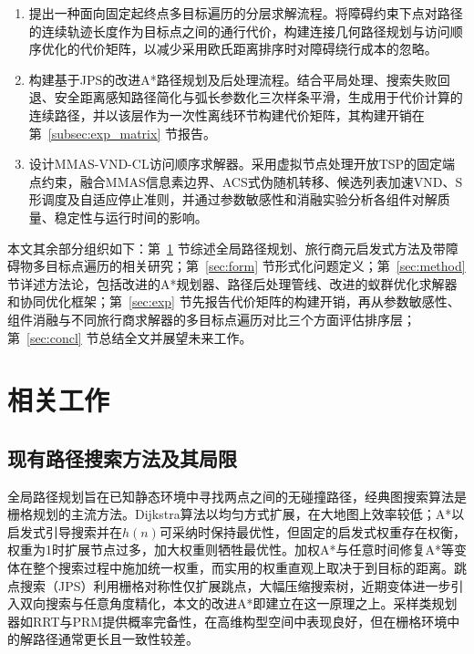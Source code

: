 \documentclass[lettersize,journal]{IEEEtran}
\begin{document}
\begin{enumerate}

\item 提出一种面向固定起终点多目标遍历的分层求解流程。将障碍约束下点对路径的连续轨迹长度作为目标点之间的通行代价，构建连接几何路径规划与访问顺序优化的代价矩阵，以减少采用欧氏距离排序时对障碍绕行成本的忽略。

\item 构建基于JPS的改进A*路径规划及后处理流程。结合平局处理、搜索失败回退、安全距离感知路径简化与弧长参数化三次样条平滑，生成用于代价计算的连续路径，并以该层作为一次性离线环节构建代价矩阵，其构建开销在第~\textcolor{blue}{\ref{subsec:exp_matrix}} 节报告。

\item 设计MMAS-VND-CL访问顺序求解器。采用虚拟节点处理开放TSP的固定端点约束，融合MMAS信息素边界、ACS式伪随机转移、候选列表加速VND、S形调度及自适应停止准则，并通过参数敏感性和消融实验分析各组件对解质量、稳定性与运行时间的影响。

\end{enumerate}

本文其余部分组织如下：第~\textcolor{blue}{\ref{sec:related}} 节综述全局路径规划、旅行商元启发式方法及带障碍物多目标点遍历的相关研究；第~\textcolor{blue}{\ref{sec:form}} 节形式化问题定义；第~\textcolor{blue}{\ref{sec:method}} 节详述方法论，包括改进的A*规划器、路径后处理管线、改进的蚁群优化求解器和协同优化框架；第~\textcolor{blue}{\ref{sec:exp}} 节先报告代价矩阵的构建开销，再从参数敏感性、组件消融与不同旅行商求解器的多目标点遍历对比三个方面评估排序层；第~\textcolor{blue}{\ref{sec:concl}} 节总结全文并展望未来工作。

\section{相关工作}

\label{sec:related}

\subsection{现有路径搜索方法及其局限}

全局路径规划旨在已知静态环境中寻找两点之间的无碰撞路径，经典图搜索算法是栅格规划的主流方法\textcolor{blue}{\cite{ref33,ref34,ref35}}。Dijkstra算法以均匀方式扩展，在大地图上效率较低\textcolor{blue}{\cite{ref6}}；A*以启发式引导搜索并在$h(n)$可采纳时保持最优性\textcolor{blue}{\cite{ref5}}，但固定的启发式权重存在权衡，权重为1时扩展节点过多，加大权重则牺牲最优性\textcolor{blue}{\cite{ref8}}。加权A*与任意时间修复A*等变体在整个搜索过程中施加统一权重\textcolor{blue}{\cite{ref8,ref10}}，而实用的权重直观上取决于到目标的距离。跳点搜索（JPS）利用栅格对称性仅扩展跳点，大幅压缩搜索树\textcolor{blue}{\cite{ref11,ref12,ref44}}，近期变体进一步引入双向搜索与任意角度精化\textcolor{blue}{\cite{ref13,ref14,ref15}}，本文的改进A*即建立在这一原理之上。采样类规划器如RRT\textcolor{blue}{\cite{ref7}}与PRM提供概率完备性，在高维构型空间中表现良好，但在栅格环境中的解路径通常更长且一致性较差。
\end{document}
